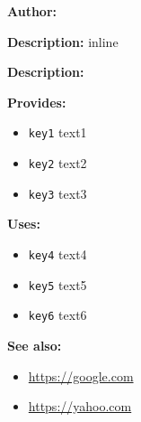 \textbf{Author:} 

\textbf{Description:}
 inline 

\textbf{Description:}
 

\textbf{Provides:}
\begin{itemize}
  \item\texttt{key1} text1
  \item\texttt{key2} text2
  \item\texttt{key3} text3
\end{itemize}

\textbf{Uses:}
\begin{itemize}
  \item\texttt{key4} text4
  \item\texttt{key5} text5
  \item\texttt{key6} text6
\end{itemize}

\textbf{See also:}
\begin{itemize}
  \item\href{https://google.com}{https://google.com}
  \item\href{https://yahoo.com}{https://yahoo.com}
\end{itemize}

